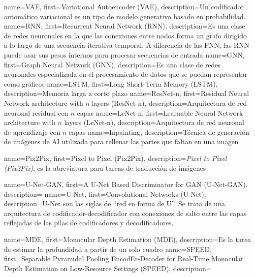       {name={VAE},        first={Variational Autoencoder (VAE)},                                      description={Un codificador automático variacional es un tipo de modelo generativo basado en probabilidad.}}
      {name={RNN},        first={Recurrent Neural Network (RNN)},                                     description={Es una clase de redes neuronales en la que las conexiones entre nodos forma un grafo dirigido a lo largo de una secuencia iterativa temporal. A diferencia de las FNN, las RNN puede usar sus pesos internos para procesar secuencias de entrada}}
      {name={GNN},        first={Graph Neural Network (GNN)},                                         description={Es una clase de redes neuronales especializada en el procesamiento de datos que se puedan representar como gráficos}}
     {name={LSTM},       first={Long Short-Term Memory (LSTM)},                                      description={Memoria larga a corto plazo}}
 {name={ResNet-n},   first={Residual Neural Network architecture with $n$ layers (ResNet-n)},    description={Arquitectura de red neuronal residual con $n$ capas}}
  {name={LeNet-n},    first={Learnable Neural Network architecture with $n$ layers (LeNet-n)},    description={Arquitectura de red neuronal de aprendizaje con $n$ capas}}
     {name={Inpainting}, description={Técnica de generación de imágenes de AI utilizada para rellenar las partes que faltan en una imagen}}


  {name={Pix2Pix},    first={Pixel to Pixel (Pix2Pix)},                   description={\textit{Pixel to Pixel (Pix2Pix)}, es la abreviatura para tareas de traducción de imágenes}}


    {name={U-Net-GAN},  first={A U-Net Based Discriminator for GAN (U-Net-GAN)},        description={}}
        {name={U-Net},      first={Convolutional Networks (U-Net)},                         description={U-Net son las siglas de ``red en forma de U''. Se trata de una arquitectura de codificador-decodificador con conexiones de salto entre las capas reflejadas de las pilas de codificadores y decodificadores.}}


      {name={MDE},        first={Monocular Depth Estimation (MDE)},                           description={Es la tarea de estimar la profundidad a partir de un solo cuadro}}
    {name={SPEED},      first={Separable Pyramidal Pooling EncodEr-Decoder for Real-Time Monocular Depth Estimation on Low-Resource Settings (SPEED)},  description={}}


